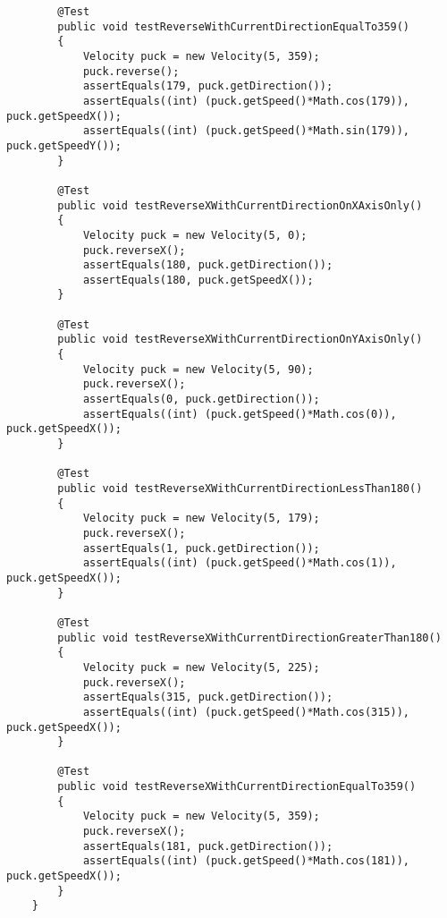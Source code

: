 \documentclass{article}
\begin{document}
\begin{lstlisting}
        @Test
        public void testReverseWithCurrentDirectionEqualTo359()
        {
            Velocity puck = new Velocity(5, 359);
            puck.reverse();
            assertEquals(179, puck.getDirection());
            assertEquals((int) (puck.getSpeed()*Math.cos(179)), puck.getSpeedX());
            assertEquals((int) (puck.getSpeed()*Math.sin(179)), puck.getSpeedY());
        }

        @Test
        public void testReverseXWithCurrentDirectionOnXAxisOnly()
        {
            Velocity puck = new Velocity(5, 0);
            puck.reverseX();
            assertEquals(180, puck.getDirection());
            assertEquals(180, puck.getSpeedX());
        }

        @Test
        public void testReverseXWithCurrentDirectionOnYAxisOnly()
        {
            Velocity puck = new Velocity(5, 90);
            puck.reverseX();
            assertEquals(0, puck.getDirection());
            assertEquals((int) (puck.getSpeed()*Math.cos(0)), puck.getSpeedX());
        }

        @Test
        public void testReverseXWithCurrentDirectionLessThan180()
        {
            Velocity puck = new Velocity(5, 179);
            puck.reverseX();
            assertEquals(1, puck.getDirection());
            assertEquals((int) (puck.getSpeed()*Math.cos(1)), puck.getSpeedX());
        }

        @Test
        public void testReverseXWithCurrentDirectionGreaterThan180()
        {
            Velocity puck = new Velocity(5, 225);
            puck.reverseX();
            assertEquals(315, puck.getDirection());
            assertEquals((int) (puck.getSpeed()*Math.cos(315)), puck.getSpeedX());
        }

        @Test
        public void testReverseXWithCurrentDirectionEqualTo359()
        {
            Velocity puck = new Velocity(5, 359);
            puck.reverseX();
            assertEquals(181, puck.getDirection());
            assertEquals((int) (puck.getSpeed()*Math.cos(181)), puck.getSpeedX());
        }
    }
\end{lstlisting}
\end{document}
